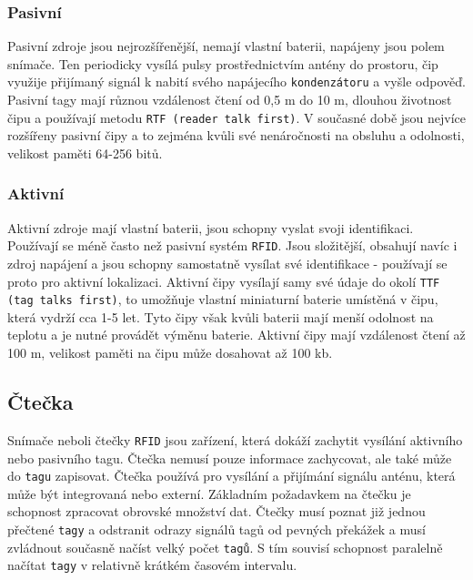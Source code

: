 \documentclass[czech,BP]{thesiskiv}
\begin{document}
\subsubsection{Pasivní}
Pasivní zdroje jsou nejrozšířenější, nemají vlastní baterii, napájeny jsou polem snímače. Ten periodicky vysílá pulsy prostřednictvím antény do prostoru, čip využije přijímaný signál k nabití svého napájecího \texttt{kondenzátoru} a vyšle odpověď. Pasivní tagy mají různou vzdálenost čtení od 0,5 m do 10 m, dlouhou životnost čipu a používají metodu \texttt{RTF (reader talk first)}. V současné době jsou nejvíce rozšířeny pasivní čipy a to zejména kvůli své nenáročnosti na obsluhu a odolnosti, velikost paměti 64-256 bitů.\cite{dolevcek2010identifikace}
\subsubsection{Aktivní}
Aktivní zdroje mají vlastní baterii, jsou schopny vyslat svoji identifikaci. Používají se méně často než pasivní systém \texttt{RFID}. Jsou složitější, obsahují navíc i zdroj napájení a jsou schopny samostatně vysílat své identifikace - používají se proto pro aktivní lokalizaci.
Aktivní čipy vysílají samy své údaje do okolí \texttt{TTF (tag talks first)}, to umožňuje vlastní miniaturní baterie umístěná v čipu, která vydrží cca 1-5 let. Tyto čipy však kvůli baterii mají menší odolnost na teplotu a je nutné provádět výměnu baterie. Aktivní čipy mají vzdálenost čtení až 100 m, velikost paměti na čipu může dosahovat až 100 kb.\cite{dolevcek2010identifikace}


\subsection{Čtečka}
Snímače neboli čtečky \texttt{RFID} jsou zařízení, která dokáží zachytit vysílání aktivního nebo pasivního tagu. Čtečka nemusí pouze informace zachycovat, ale také může do \texttt{tagu} zapisovat. Čtečka používá pro vysílání a přijímání signálu anténu, která může být integrovaná nebo externí. Základním požadavkem na čtečku je schopnost zpracovat obrovské množství dat. Čtečky musí poznat již jednou přečtené \texttt{tagy} a odstranit odrazy signálů tagů od pevných překážek a musí zvládnout současně načíst velký počet \texttt{tagů}. S tím souvisí schopnost paralelně načítat \texttt{tagy} v relativně krátkém časovém intervalu.\cite{dolevcek2010identifikace}



{\raggedright\small

}
\end{document}
